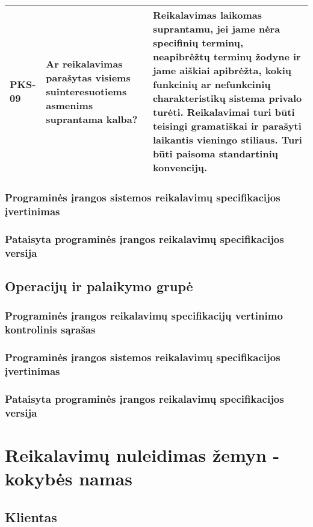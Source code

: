 \documentclass{VUMIFPSkursinis}
\begin{document}
\begin{center}
\begin{longtable}{|C{2cm}|L{5cm}|L{8cm}|}
		PKS-09                                                                        &
		Ar reikalavimas parašytas visiems suinteresuotiems asmenims suprantama kalba? &
		Reikalavimas laikomas suprantamu, jei jame nėra specifinių terminų, neapibrėžtų terminų žodyne ir jame aiškiai apibrėžta, kokių funkcinių ar nefunkcinių charakteristikų sistema privalo turėti. Reikalavimai turi būti teisingi gramatiškai ir parašyti laikantis vieningo stiliaus. Turi būti paisoma standartinių konvencijų.                                                                                                              \\ \hline
	\end{longtable}
\end{center}

\subsubsection{Programinės įrangos sistemos reikalavimų specifikacijos įvertinimas}
\subsubsection{Pataisyta programinės įrangos reikalavimų specifikacijos versija}
\subsection{Operacijų ir palaikymo grupė}
\subsubsection{Programinės įrangos reikalavimų specifikacijų vertinimo kontrolinis sąrašas}
\subsubsection{Programinės įrangos sistemos reikalavimų specifikacijos įvertinimas}
\subsubsection{Pataisyta programinės įrangos reikalavimų specifikacijos versija}

\section{Reikalavimų nuleidimas žemyn - kokybės namas}
\subsection{Klientas}
\end{document}
